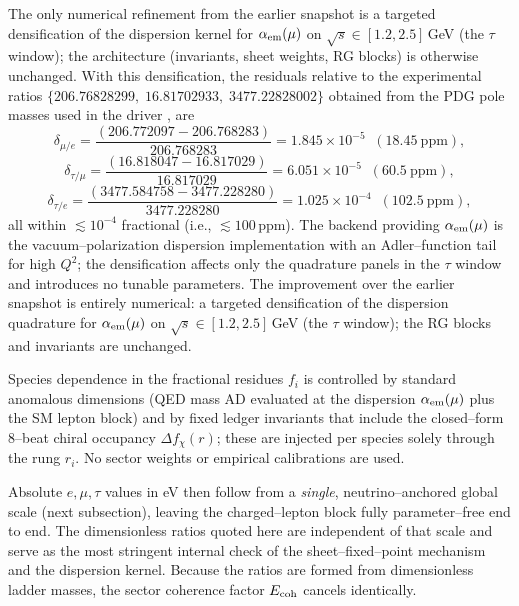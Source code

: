 \documentclass[%
 amsmath,amssymb,
 aps,
prb,
floatfix, showkeys
]{revtex4-2}
\begin{document}
The only numerical refinement from the earlier snapshot is a targeted densification of the dispersion kernel for $\alpha_{\rm em}(\mu)$ on $\sqrt{s}\!\in[1.2,2.5]\,$GeV (the $\tau$ window); the architecture (invariants, sheet weights, RG blocks) is otherwise unchanged. With this densification, the residuals relative to the experimental ratios  $\{206.76828299,\; 16.81702933,\; 3477.22828002\}$ obtained from the PDG pole masses used in the driver \cite{PDG2024},  are
\[
\delta_{\mu/e}=\frac{(206.772097-206.768283)}{206.768283}=1.845\times 10^{-5}\;\;(18.45~\mathrm{ppm}),
\]
\[
\delta_{\tau/\mu}=\frac{(16.818047-16.817029)}{16.817029}=6.051\times 10^{-5}\;\;(60.5~\mathrm{ppm}),
\]
\[
\delta_{\tau/e}=\frac{(3477.584758-3477.228280)}{3477.228280}=1.025\times 10^{-4}\;\;(102.5~\mathrm{ppm}),
\]
 all within $\lesssim 10^{-4}$ fractional (i.e., $\lesssim 100$\,ppm). The backend providing $\alpha_{\rm em}(\mu)$ is the vacuum–polarization dispersion implementation with an Adler–function tail for high $Q^2$; the densification affects only the quadrature panels in the $\tau$ window and introduces no tunable parameters.
 The improvement over the earlier snapshot is entirely numerical: a targeted densification of the dispersion quadrature for $\alpha_{\rm em}(\mu)$ on $\sqrt{s}\!\in[1.2,2.5]\,$GeV (the $\tau$ window); the RG blocks and invariants are unchanged.

Species dependence in the fractional residues $f_i$ is controlled by standard anomalous dimensions (QED mass AD evaluated at the dispersion $\alpha_{\rm em}(\mu)$ plus the SM lepton block) and by fixed ledger invariants that include the closed–form 8–beat chiral occupancy $\Delta f_\chi(r)$; these are injected per species solely through the rung $r_i$. No sector weights or empirical calibrations are used.

Absolute $e,\mu,\tau$ values in eV then follow from a \emph{single}, neutrino–anchored global scale (next subsection), leaving the charged–lepton block fully parameter–free end to end.
 The dimensionless ratios quoted here are independent of that scale and serve as the most stringent internal check of the sheet–fixed–point mechanism and the dispersion kernel.
Because the ratios are formed from dimensionless ladder masses, the sector coherence factor $E_{\rm coh}$ cancels identically.
\end{document}
